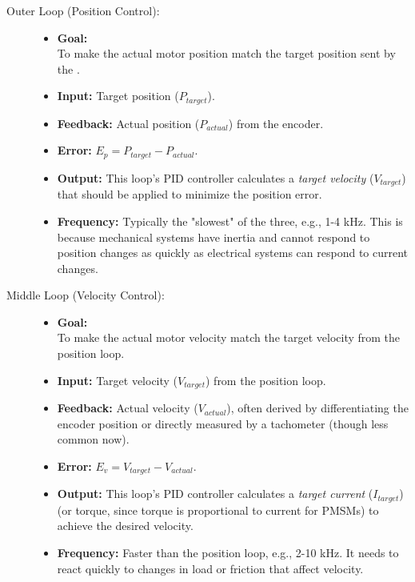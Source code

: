 \begin{description}
    \item[Outer Loop (Position Control):]
    \begin{itemize}
        \item \textbf{Goal:} \\To make the actual motor position match the target position sent by the .
        \item \textbf{Input:} Target position (\(P_{target}\)).
        \item \textbf{Feedback:} Actual position (\(P_{actual}\)) from the encoder.
        \item \textbf{Error:} \(E_p = P_{target} - P_{actual}\).
        \item \textbf{Output:} This loop's PID controller calculates a \textit{target velocity} (\(V_{target}\)) that should be applied to minimize the position error.
        \item \textbf{Frequency:} Typically the "slowest" of the three, e.g., 1-4 kHz. This is because mechanical systems have inertia and cannot respond to position changes as quickly as electrical systems can respond to current changes.
    \end{itemize}
    
    \item[Middle Loop (Velocity Control):]
    \begin{itemize}
        \item \textbf{Goal:} \\To make the actual motor velocity match the target velocity from the position loop.
        \item \textbf{Input:} Target velocity (\(V_{target}\)) from the position loop.
        \item \textbf{Feedback:} Actual velocity (\(V_{actual}\)), often derived by differentiating the encoder position or directly measured by a tachometer (though less common now).
        \item \textbf{Error:} \(E_v = V_{target} - V_{actual}\).
        \item \textbf{Output:} This loop's PID controller calculates a \textit{target current} (\(I_{target}\)) (or torque, since torque is proportional to current for PMSMs) to achieve the desired velocity.
        \item \textbf{Frequency:} Faster than the position loop, e.g., 2-10 kHz. It needs to react quickly to changes in load or friction that affect velocity.
    \end{itemize}
    

\end{description}
